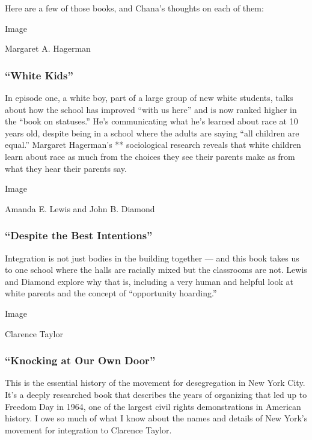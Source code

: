 Here are a few of those books, and Chana's thoughts on each of them:

Image

Margaret A. Hagerman

\hypertarget{white-kids}{%
\subsubsection{``White Kids''}\label{white-kids}}

In episode one, a white boy, part of a large group of new white
students, talks about how the school has improved ``with us here'' and
is now ranked higher in the ``book on statuses.'' He's communicating
what he's learned about race at 10 years old, despite being in a school
where the adults are saying ``all children are equal.'' Margaret
Hagerman's ** sociological research reveals that white children learn
about race as much from the choices they see their parents make as from
what they hear their parents say.

Image

Amanda E. Lewis and John B. Diamond

\hypertarget{despite-the-best-intentions}{%
\subsubsection{``Despite the Best
Intentions''}\label{despite-the-best-intentions}}

Integration is not just bodies in the building together --- and this
book takes us to one school where the halls are racially mixed but the
classrooms are not. Lewis and Diamond explore why that is, including a
very human and helpful look at white parents and the concept of
``opportunity hoarding.''

Image

Clarence Taylor

\hypertarget{knocking-at-our-own-door}{%
\subsubsection{``Knocking at Our Own
Door''}\label{knocking-at-our-own-door}}

This is the essential history of the movement for desegregation in New
York City. It's a deeply researched book that describes the years of
organizing that led up to Freedom Day in 1964, one of the largest civil
rights demonstrations in American history. I owe so much of what I know
about the names and details of New York's movement for integration to
Clarence Taylor.

